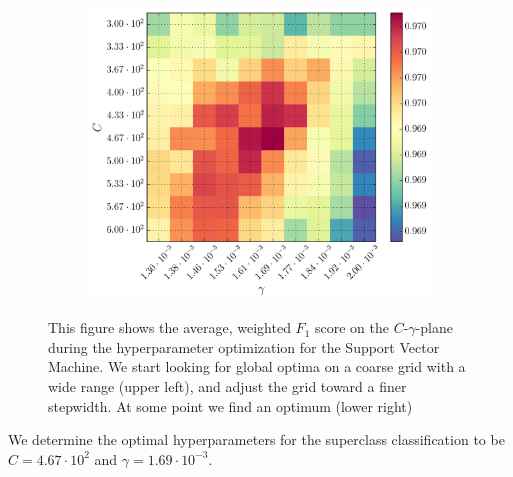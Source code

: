 \begin{figure}[h]
\begin{subfigure}[t]{0.49\textwidth}
		\includegraphics[width=\textwidth]{figures/gridsearch/svm/superclasses/svm-superclasses-06.png}		
	\end{subfigure}
	\caption[Hyperparameter optimization for the Support Vector Machine (SVM)]{This figure shows the average, weighted $F_1$ score on the $C$-$\gamma$-plane during the hyperparameter optimization for the Support Vector Machine. We start looking for global optima on a coarse grid with a wide range (upper left), and adjust the grid toward a finer stepwidth. At some point we find an optimum (lower right)}
	\label{fig:gridsearch-svm-superclasses}
\end{figure}

We determine the optimal hyperparameters for the superclass classification to be $C = 4.67 \cdot 10^{2}$ and $\gamma = 1.69 \cdot 10^{-3}$.

